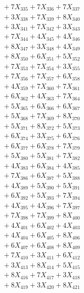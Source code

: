 \documentclass[a4paper,10pt]{article}
\begin{document}
{\begin{align}
&\;  + 7 X_{335} + 7 X_{336} + 7 X_{337} \\[0.3ex]
&\;  + 3 X_{338} + 7 X_{339} + 8 X_{340} \\[0.5ex]\allowbreak
&\;  + 3 X_{341} + 7 X_{342} + 3 X_{343} \\[0.3ex]
&\;  + 7 X_{344} + 4 X_{345} + 4 X_{346} \\[0.3ex]
&\;  + 8 X_{347} + 3 X_{348} + 4 X_{349} \\[0.3ex]
&\;  + 8 X_{350} + 6 X_{351} + 5 X_{352} \\[0.3ex]
&\;  + 7 X_{353} + 7 X_{354} + 3 X_{355} \\[0.3ex]
&\;  + 7 X_{356} + 7 X_{357} + 6 X_{358} \\[0.3ex]
&\;  + 4 X_{359} + 7 X_{360} + 7 X_{361} \\[0.3ex]
&\;  + 6 X_{362} + 4 X_{363} + 7 X_{364} \\[0.3ex]
&\;  + 5 X_{365} + 6 X_{366} + 6 X_{367} \\[0.3ex]
&\;  + 5 X_{368} + 7 X_{369} + 8 X_{370} \\[0.5ex]\allowbreak
&\;  + 5 X_{371} + 8 X_{372} + 5 X_{373} \\[0.3ex]
&\;  + 6 X_{374} + 3 X_{375} + 6 X_{376} \\[0.3ex]
&\;  + 6 X_{377} + 6 X_{378} + 7 X_{379} \\[0.3ex]
&\;  + 5 X_{380} + 5 X_{381} + 7 X_{382} \\[0.3ex]
&\;  + 4 X_{383} + 6 X_{384} + 4 X_{385} \\[0.3ex]
&\;  + 7 X_{386} + 6 X_{387} + 5 X_{388} \\[0.3ex]
&\;  + 4 X_{389} + 5 X_{390} + 5 X_{391} \\[0.3ex]
&\;  + 6 X_{392} + 5 X_{393} + 7 X_{394} \\[0.3ex]
&\;  + 4 X_{395} + 4 X_{396} + 7 X_{397} \\[0.3ex]
&\;  + 7 X_{398} + 7 X_{399} + 8 X_{400} \\[0.5ex]\allowbreak
&\;  + 4 X_{401} + 6 X_{402} + 4 X_{403} \\[0.3ex]
&\;  + 4 X_{404} + 6 X_{405} + 8 X_{406} \\[0.3ex]
&\;  + 6 X_{407} + 6 X_{408} + 8 X_{409} \\[0.3ex]
&\;  + 7 X_{410} + 3 X_{411} + 6 X_{412} \\[0.3ex]
&\;  + 3 X_{413} + 8 X_{414} + 5 X_{415} \\[0.3ex]
&\;  + 8 X_{416} + 7 X_{417} + 3 X_{418} \\[0.3ex]
&\;  + 8 X_{419} + 3 X_{420} + 8 X_{421} \\[0.3ex]

\end{align}}
\end{document}
